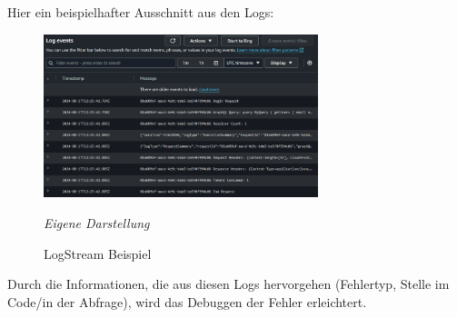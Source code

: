 Hier ein beispielhafter Ausschnitt aus den Logs:
	\begin{figure}[H]
	\centering
	\begin{minipage}[t]{.7\textwidth} %
	\caption{LogStream Beispiel} %
	
	\includegraphics[width = 8cm,keepaspectratio]{logStreamExample} \newline
	
	\textit{Eigene Darstellung} %
	\label{fig:logStreamBeispiel}
	\end{minipage}
	\end{figure}
 
Durch die Informationen, die aus diesen Logs hervorgehen (Fehlertyp, Stelle im Code/in der Abfrage), wird das Debuggen der Fehler erleichtert. 